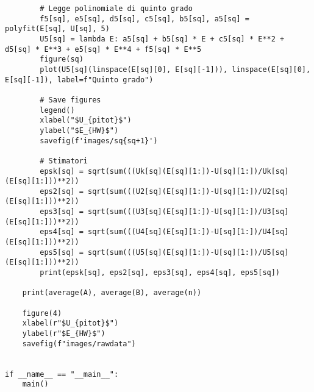 \begin{lstlisting}
        # Legge polinomiale di quinto grado
        f5[sq], e5[sq], d5[sq], c5[sq], b5[sq], a5[sq] = polyfit(E[sq], U[sq], 5)
        U5[sq] = lambda E: a5[sq] + b5[sq] * E + c5[sq] * E**2 + d5[sq] * E**3 + e5[sq] * E**4 + f5[sq] * E**5
        figure(sq)
        plot(U5[sq](linspace(E[sq][0], E[sq][-1])), linspace(E[sq][0], E[sq][-1]), label=f"Quinto grado")

        # Save figures
        legend()
        xlabel("$U_{pitot}$")
        ylabel("$E_{HW}$")
        savefig(f'images/sq{sq+1}')

        # Stimatori
        epsk[sq] = sqrt(sum(((Uk[sq](E[sq][1:])-U[sq][1:])/Uk[sq](E[sq][1:]))**2))
        eps2[sq] = sqrt(sum(((U2[sq](E[sq][1:])-U[sq][1:])/U2[sq](E[sq][1:]))**2))
        eps3[sq] = sqrt(sum(((U3[sq](E[sq][1:])-U[sq][1:])/U3[sq](E[sq][1:]))**2))
        eps4[sq] = sqrt(sum(((U4[sq](E[sq][1:])-U[sq][1:])/U4[sq](E[sq][1:]))**2))
        eps5[sq] = sqrt(sum(((U5[sq](E[sq][1:])-U[sq][1:])/U5[sq](E[sq][1:]))**2))
        print(epsk[sq], eps2[sq], eps3[sq], eps4[sq], eps5[sq])

    print(average(A), average(B), average(n))

    figure(4)
    xlabel(r"$U_{pitot}$")
    ylabel(r"$E_{HW}$")
    savefig(f"images/rawdata")


if __name__ == "__main__":
    main()
\end{lstlisting}


